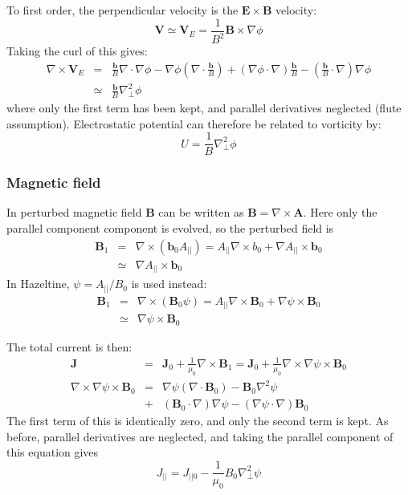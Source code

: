 \documentclass[12pt, a4paper]{article}
\newcommand{\apar}{\ensuremath{A_{||}}}
\newcommand{\Vec}[1]{\ensuremath{\mathbf{#1}}}
\newcommand{\bvec}{\Vec{b}}
\newcommand{\Bvec}{\Vec{B}}
\newcommand{\Jvec}{\Vec{J}}
\newcommand{\Jpar}{J_{||}}
\newcommand{\delp}{\nabla_\perp^2}
\newcommand{\Div}[1]{\ensuremath{\nabla\cdot #1 }}
\newcommand{\Curl}[1]{\ensuremath{\nabla\times #1 }}
\begin{document}
To first order, the perpendicular velocity is the $\Vec{E\times B}$ velocity:
\[
\Vec{V}\simeq\Vec{V}_E = \frac{1}{B^2}\Bvec\times\nabla\phi
\]
Taking the curl of this gives:
\begin{eqnarray*}
\Curl{\Vec{V}_E} &=& \frac{\bvec}{B}\Div{\nabla\phi} - \nabla\phi\left(\Div{\frac{\bvec}{B}}\right) + \left(\nabla\phi\cdot\nabla\right)\frac{\bvec}{B} - \left(\frac{\bvec}{B}\cdot\nabla\right)\nabla\phi \\
&\simeq& \frac{\bvec}{B}\delp\phi
\end{eqnarray*}
where only the first term has been kept, and parallel derivatives neglected (flute assumption). Electrostatic potential
can therefore be related to vorticity by:
\begin{equation}
U = \frac{1}{B}\delp\phi
\label{eq:phi_solve}
\end{equation}

\subsubsection{Magnetic field}

In perturbed magnetic field $\Bvec$ can be written as $\Bvec = \Curl{\Vec{A}}$. Here only the parallel component
component is evolved, so the perturbed field is
\begin{eqnarray*}
\Bvec_1 &=& \Curl{\left(\bvec_0\apar\right)} = \apar\Curl{b_0} + \nabla\apar\times\bvec_0 \\
&\simeq& \nabla\apar\times\bvec_0
\end{eqnarray*}
In Hazeltine, $\psi = \apar / B_0$ is used instead:
\begin{eqnarray}
\Bvec_1 &=& \Curl{\left(\Bvec_0\psi\right)} = \apar\Curl{\Bvec_0} + \nabla\psi\times\Bvec_0 \nonumber \\
&\simeq& \nabla\psi\times\Bvec_0 \label{eq:psidef}
\end{eqnarray}


The total current is then:
\begin{eqnarray*}
\Jvec &=& \Jvec_0 + \frac{1}{\mu_0}\Curl{\Bvec_1} = \Jvec_0 + \frac{1}{\mu_0}\Curl{\nabla\psi\times\Bvec_0} \\
\Curl{\nabla\psi\times\Bvec_0} &=& \nabla\psi\left(\Div{\Bvec_0}\right) - \Bvec_0 \nabla^2\psi \\
&+& \left(\Bvec_0\cdot\nabla\right)\nabla\psi - \left(\nabla\psi\cdot\nabla\right)\Bvec_0
\end{eqnarray*}
The first term of this is identically zero, and only the second term is kept. 
As before, parallel derivatives are neglected, and taking the parallel component of this equation gives
\begin{equation}
\Jpar = J_{||0} - \frac{1}{\mu_0}B_0\delp\psi
\label{eq:jpar}
\end{equation}
\end{document}
